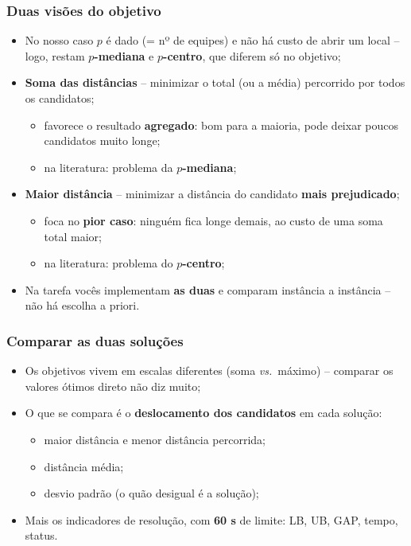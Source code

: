 \documentclass[fleqn]{beamer}
\begin{document}
\begin{frame}
	\frametitle{Duas visões do objetivo}
	\begin{itemize}
		\item No nosso caso $p$ é dado (= nº de equipes) e não há custo de
			abrir um local -- logo, restam \textbf{$p$-mediana} e
			\textbf{$p$-centro}, que diferem só no objetivo;
		\item \textbf{Soma das distâncias} -- minimizar o total (ou a
			média) percorrido por todos os candidatos;
		\begin{itemize}
			\item favorece o resultado \textbf{agregado}: bom para a
				maioria, pode deixar poucos candidatos muito longe;
			\item na literatura: problema da \textbf{$p$-mediana};
		\end{itemize}
		\item \textbf{Maior distância} -- minimizar a distância do
			candidato \textbf{mais prejudicado};
		\begin{itemize}
			\item foca no \textbf{pior caso}: ninguém fica longe demais,
				ao custo de uma soma total maior;
			\item na literatura: problema do \textbf{$p$-centro};
		\end{itemize}
		\item Na tarefa vocês implementam \textbf{as duas} e comparam
			instância a instância -- não há escolha a priori.
	\end{itemize}
\end{frame}

\begin{frame}
	\frametitle{Comparar as duas soluções}
	\begin{itemize}
		\item Os objetivos vivem em escalas diferentes (soma
			\emph{vs.}\ máximo) -- comparar os valores ótimos direto não
			diz muito;
		\item O que se compara é o \textbf{deslocamento dos candidatos}
			em cada solução:
		\begin{itemize}
			\item maior distância e menor distância percorrida;
			\item distância média;
			\item desvio padrão (o quão desigual é a solução);
		\end{itemize}
		\item Mais os indicadores de resolução, com \textbf{60 s} de
			limite: LB, UB, GAP, tempo, status.
	\end{itemize}
\end{frame}
\end{document}
